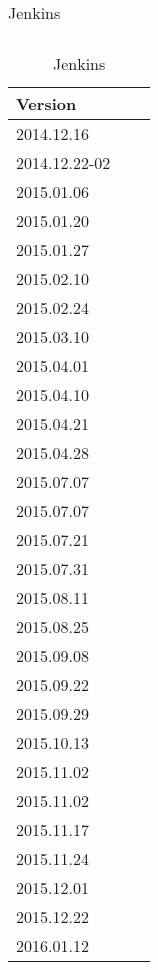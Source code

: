 \begin{table}[h!]
{\begin{tabular}{l*{1}{l}r}
\hline
\end{tabular}
\caption{Jenkins}
\label{jenkins}
}
\hfill
\parbox{.45\linewidth}{
\centering
\begin{tabular}{l*{1}{l}r}
\hline
Version  \\
\hline
2014.12.16      \\
2014.12.22-02   \\
2015.01.06      \\
2015.01.20      \\
2015.01.27      \\
2015.02.10      \\
2015.02.24      \\
2015.03.10      \\
2015.04.01      \\
2015.04.10      \\
2015.04.21      \\
2015.04.28      \\
2015.07.07      \\
2015.07.07      \\
2015.07.21      \\
2015.07.31      \\
2015.08.11      \\
2015.08.25      \\
2015.09.08      \\
2015.09.22      \\
2015.09.29      \\
2015.10.13      \\
2015.11.02      \\
2015.11.02      \\
2015.11.17      \\
2015.11.24      \\
2015.12.01      \\
2015.12.22      \\
2016.01.12 \\

\hline
\end{tabular}
\caption{Jenkins}
\label{jenkins}
}
\end{table}

